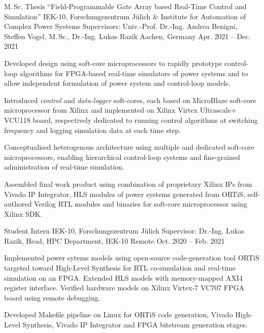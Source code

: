 
\begin{cvexperience}

\cvposition
	{M.\,Sc. Thesis ``Field-Programmable Gate Array based Real-Time Control and Simulation''} %
	{IEK-10, Forschungszentrum J\"ulich \& Institute for Automation of Complex Power Systems} %
	{Supervisors: Univ.-Prof. Dr.-Ing. Andrea Benigni, Steffen Vogel, M.\,Sc., Dr.-Ing. Lukas Razik} %
	{Aachen, Germany  {\acvHeaderIconSep{}} {} } %
	{Apr. 2021 -- Dec. 2021  {\acvHeaderIconSep{}} {} } %
	{\begin{cvitems}
		\item {Developed design using soft-core microprocessors to rapidly prototype control-loop algorithms for FPGA-based real-time simulators of power systems and to allow independent formulation of power system and control-loop models.}
		\item {Introduced \textit{control} and \textit{data-logger} soft-cores, each based on MicroBlaze soft-core microprocessor from Xilinx and implemented on Xilinx Virtex Ultrascale+ VCU118 board, respectively dedicated to running control algorithms at switching frequency and logging simulation data at each time step.} 
		\item {Conceptualised heterogenous architecture using multiple and dedicated soft-core microprocessors, enabling hierarchical control-loop systems and fine-grained administration of real-time simulation.}
  		\item {Assembled final work product using combination of proprietary Xilinx IPs from Vivado IP Integrator, HLS modules of power systems generated from ORTiS, self-authored Verilog RTL modules and binaries for soft-core microprocessor using Xilinx SDK.}
	\end{cvitems}}

\cvposition
	{Student Intern} %
	{IEK-10, Forschungszentrum J\"ulich} %
	{Supervisor: Dr.-Ing. Lukas Razik, Head, HPC Department, IEK-10} %
	{Remote  {\acvHeaderIconSep{}} {} } %
	{Oct. 2020 -- Feb. 2021  {\acvHeaderIconSep{}} {} } %
	{\begin{cvitems}
		\item {Implemented power sytems models using open-source code-generation tool ORTiS targeted toward High-Level Synthesis for RTL co-simulation and real-time simulation on an FPGA. Extended HLS models with memory-mapped AXI4 register interface. Verified hardware models on Xilinx Virtex-7 VC707 FPGA board using remote debugging.}
  		\item {Developed Makefile pipeline on Linux for ORTiS code generation, Vivado High-Level Synthesis, Vivado IP Integrator and FPGA bitstream generation stages.}
	\end{cvitems}}


\end{cvexperience}
